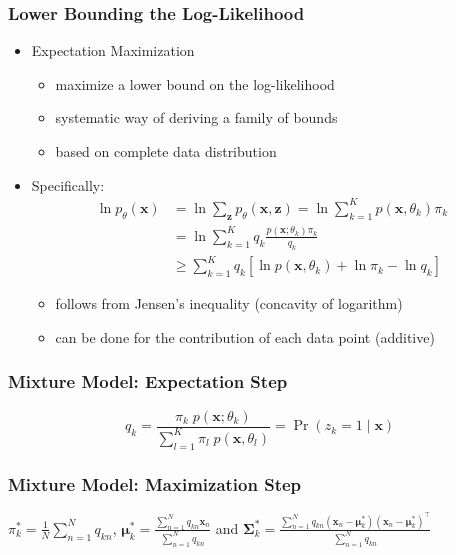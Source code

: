 \documentclass[11pt,a4paper,technote]{IEEEtran}
\newcommand{\matr}[1]{\boldsymbol{\mathbf{#1}}}
\newcommand{\vect}[1]{\boldsymbol{\mathbf{#1}}}
\newcommand{\trns}[1]{#1^{\top}}
\begin{document}
\subsubsection*{Lower Bounding the Log-Likelihood}
\begin{itemize}
  \item Expectation Maximization
    \begin{itemize}
      \item maximize a lower bound on the log-likelihood
      \item systematic way of deriving a family of bounds
      \item based on complete data distribution
    \end{itemize}
  \item Specifically:
    \begin{align*}
      \ln p_{\theta}(\vect{x}) &= \ln \sum_{\vect{z}} p_{\theta}(\vect{x},
      \vect{z}) = \ln \sum_{k=1}^K p(\vect{x}, \theta_k) \pi_k \\
      &= \ln \sum_{k=1}^K q_k \frac{p(\vect{x}; \theta_k) \pi_k}{q_k} \\
      &\geq \sum_{k=1}^K q_k \left[\ln p(\vect{x},\theta_k)+\ln\pi_k-\ln q_k \right]
    \end{align*}
    \begin{itemize}
      \item follows from Jensen's inequality (concavity of logarithm)
      \item can be done for the contribution of each data point (additive)
    \end{itemize}
\end{itemize}

\subsubsection*{Mixture Model: Expectation Step}
\[
  q_k = \frac{\pi_k\; p(\vect{x}; \theta_k)}{\sum_{l=1}^K \pi_l\;p(\vect{x}, \theta_l)}
  = \Pr(z_k = 1 \mid \vect{x})
\]

\subsubsection*{Mixture Model: Maximization Step}
\( \pi_k^* = \frac{1}{N} \sum_{n=1}^N q_{kn} \),
\( \vect{\mu}_k^* = \frac{\sum_{n=1}^N q_{kn}\vect{x}_n}{\sum_{n=1}^N q_{kn}} \)
and
\(
  \matr{\Sigma}_k^* = \frac{\sum_{n=1}^N q_{kn}(\vect{x}_n -
    \vect{\mu}_k^*)\trns{(\vect{x}_n - \vect{\mu}_k^*)}}{\sum_{n=1}^N q_{kn}}
\)
\end{document}

